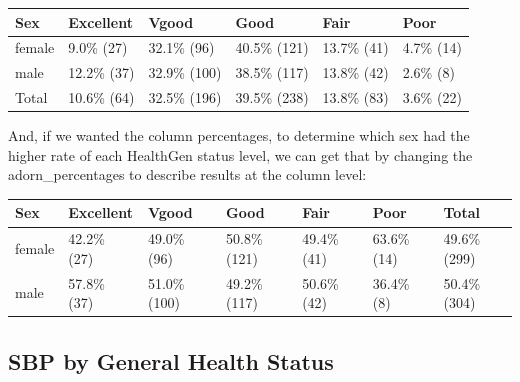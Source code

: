 \documentclass[
]{book}
\newenvironment{Shaded}{\begin{snugshade}}{\end{snugshade}}
\newcommand{\KeywordTok}[1]{\textcolor[rgb]{0.13,0.29,0.53}{\textbf{#1}}}
\newcommand{\NormalTok}[1]{#1}
\newcommand{\OperatorTok}[1]{\textcolor[rgb]{0.81,0.36,0.00}{\textbf{#1}}}
\newcommand{\StringTok}[1]{\textcolor[rgb]{0.31,0.60,0.02}{#1}}
\begin{document}
\begin{tabular}{l|l|l|l|l|l}
\hline
Sex & Excellent & Vgood & Good & Fair & Poor\\
\hline
female & 9.0\% (27) & 32.1\%  (96) & 40.5\% (121) & 13.7\% (41) & 4.7\% (14)\\
\hline
male & 12.2\% (37) & 32.9\% (100) & 38.5\% (117) & 13.8\% (42) & 2.6\%  (8)\\
\hline
Total & 10.6\% (64) & 32.5\% (196) & 39.5\% (238) & 13.8\% (83) & 3.6\% (22)\\
\hline
\end{tabular}

And, if we wanted the column percentages, to determine which sex had the higher rate of each HealthGen status level, we can get that by changing the adorn\_percentages to describe results at the column level:

\begin{Shaded}
\end{Shaded}

\begin{tabular}{l|l|l|l|l|l|l}
\hline
Sex & Excellent & Vgood & Good & Fair & Poor & Total\\
\hline
female & 42.2\% (27) & 49.0\%  (96) & 50.8\% (121) & 49.4\% (41) & 63.6\% (14) & 49.6\% (299)\\
\hline
male & 57.8\% (37) & 51.0\% (100) & 49.2\% (117) & 50.6\% (42) & 36.4\%  (8) & 50.4\% (304)\\
\hline
\end{tabular}

\hypertarget{sbp-by-general-health-status}{%
\subsection{SBP by General Health Status}\label{sbp-by-general-health-status}}
\end{document}
